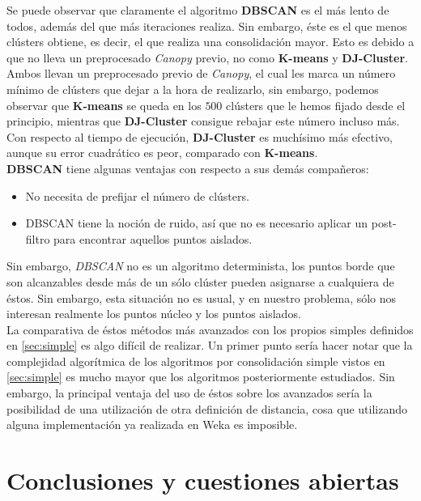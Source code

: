 \documentclass[a4paper, 12pt, spanish]{article}
\begin{document}
Se puede observar que claramente el algoritmo \textbf{DBSCAN} es el m\'as lento de todos, adem\'as del que m\'as iteraciones realiza. Sin embargo, \'este es el que menos cl\'usters obtiene, es decir, el que realiza una consolidaci\'on mayor. Esto es debido a que no lleva un preprocesado \textit{Canopy} previo, no como \textbf{K-means} y \textbf{DJ-Cluster}. Ambos llevan un preprocesado previo de \textit{Canopy}, el cual les marca un n\'umero m\'inimo de cl\'usters que dejar a la hora de realizarlo, sin embargo, podemos observar que \textbf{K-means} se queda en los $500$ cl\'usters que le hemos fijado desde el principio, mientras que \textbf{DJ-Cluster} consigue rebajar este n\'umero incluso m\'as. Con respecto al tiempo de ejecuci\'on, \textbf{DJ-Cluster} es much\'isimo m\'as efectivo, aunque su error cuadr\'atico es peor, comparado con \textbf{K-means}.\\

\textbf{DBSCAN} tiene algunas ventajas con respecto a sus dem\'as compa\~neros:

\begin{itemize}
	\item No necesita de prefijar el n\'umero de cl\'usters.
	\item DBSCAN tiene la noci\'on de ruido, as\'i que no es necesario aplicar un post-filtro para encontrar aquellos puntos aislados. 
\end{itemize}

Sin embargo, \textit{DBSCAN} no es un algoritmo determinista, los puntos borde que son alcanzables desde m\'as de un s\'olo cl\'uster pueden asignarse a cualquiera de \'estos. Sin embargo, esta situaci\'on no es usual, y en nuestro problema, s\'olo nos interesan realmente los puntos n\'ucleo y los puntos aislados. \\

La comparativa de \'estos m\'etodos m\'as avanzados con los propios simples definidos en \ref{sec:simple} es algo dif\'icil de realizar. Un primer punto ser\'ia hacer notar que la complejidad algor\'itmica de los algoritmos por consolidaci\'on simple vistos en \ref{sec:simple} es mucho mayor que los algoritmos posteriormente estudiados. Sin embargo, la principal ventaja del uso de \'estos sobre los avanzados ser\'ia la posibilidad de una utilizaci\'on de otra definici\'on de distancia, cosa que utilizando alguna implementaci\'on ya realizada en Weka es imposible.\\


\pagebreak
\section{Conclusiones y cuestiones abiertas}
\end{document}
